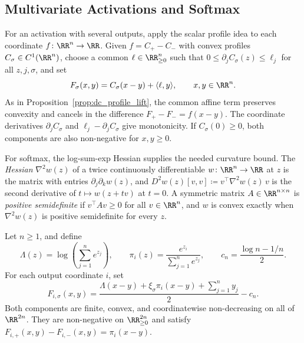 \subsection{Multivariate Activations and Softmax}\label{sec:multivariate_dc_softmax}

For an activation with several outputs, apply the scalar profile idea to each coordinate $f\colon\RR^n\to\RR$. Given $f=C_+-C_-$ with convex profiles $C_\sigma\in C^1(\RR^n)$, choose a common $\ell\in\RR^n_{\ge0}$ such that $0\le\partial_jC_\sigma(z)\le\ell_j$ for all $z,j,\sigma$, and set
\begin{equation}
    F_\sigma(x,y)=C_\sigma(x-y)+\langle\ell,y\rangle,
    \qquad x,y\in\RR^n.
    \label{eq:multivariate_dc_lift}
\end{equation}
As in Proposition~\ref{prop:dc_profile_lift}, the common affine term preserves convexity and cancels in the difference $F_+-F_-=f(x-y)$. The coordinate derivatives $\partial_jC_\sigma$ and $\ell_j-\partial_jC_\sigma$ give monotonicity. If $C_\sigma(0)\ge0$, both components are also non-negative for $x,y\ge0$.

For softmax, the log-sum-exp Hessian supplies the needed curvature bound. The \emph{Hessian} $\nabla^2w(z)$ of a twice continuously differentiable $w\colon\RR^n\to\RR$ at $z$ is the matrix with entries $\partial_j\partial_kw(z)$, and $D^2w(z)[v,v]\coloneqq v^\top\nabla^2w(z)\,v$ is the second derivative of $t\mapsto w(z+tv)$ at $t=0$. A symmetric matrix $A\in\RR^{n\times n}$ is \emph{positive semidefinite} if $v^\top Av\ge0$ for all $v\in\RR^n$, and $w$ is convex exactly when $\nabla^2w(z)$ is positive semidefinite for every $z$.

\begin{theoremenv}\label{thm:softmax_dc_split}
Let $n\ge1$, and define
\begin{equation*}
    \Lambda(z)=\log\!\left(\sum_{j=1}^n e^{z_j}\right),
    \qquad \pi_i(z)=\frac{e^{z_i}}{\sum_{j=1}^n e^{z_j}},
    \qquad c_n=\frac{\log n-1/n}{2}.
\end{equation*}
For each output coordinate $i$, set
\begin{equation}
    F_{i,\sigma}(x,y)
    =\frac{\Lambda(x-y)+\xi_\sigma\pi_i(x-y)+\sum_{j=1}^n y_j}{2}-c_n.
    \label{eq:softmax_dc_pair}
\end{equation}
Both components are finite, convex, and coordinatewise non-decreasing on all of $\RR^{2n}$. They are non-negative on $\RR^{2n}_{\ge0}$ and satisfy
$F_{i,+}(x,y)-F_{i,-}(x,y)=\pi_i(x-y)$.
\end{theoremenv}

